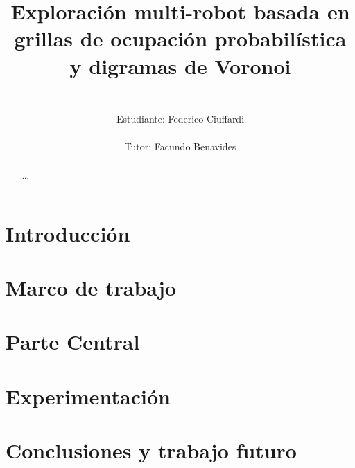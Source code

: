 \documentclass{report}
\title{%
\begin{figure}[H]
\vspace{-2.5cm}
  \subfloat{\hspace{0.075\textwidth}}
  \subfloat{\texttt{[image: logos/udelar.jpg]}}
  \subfloat{\hspace{0.2\textwidth}}
  \subfloat{\texttt{[image: logos/logo-fing.png]}}
  \subfloat{\hspace{0.2\textwidth}}
  \subfloat{\texttt{[image: logos/inco.png]}}
\end{figure}
\vspace{0.25cm}
\huge
Exploración multi-robot basada en grillas de ocupación probabilística y digramas de Voronoi\\
}
\author{%
\Large
\vspace{0.5cm}\\
Estudiante: Federico Ciuffardi\\
\vspace{0.5cm}\\
Tutor: Facundo Benavides%
}
\date{}
\renewcommand\_{\textunderscore\allowbreak}
\begin{document}

\maketitle

\thispagestyle{empty}
\setcounter{page}{1}

\begin{abstract}    %
    ...
\end{abstract}

\hfuzz=10pt 
\tableofcontents
\hfuzz=0pt 

\listoffigures  %
\listoftables   %
\listofalgorithms %

\chapter{Introducción}\label{cha:Intro}
\hfuzz=10pt 
\minitoc
\hfuzz=0pt 


\chapter{Marco de trabajo}\label{cha:marco}
\hfuzz=10pt 
\minitoc
\hfuzz=0pt 



\chapter{Parte Central}\label{cha:central}
\hfuzz=10pt 
\minitoc
\hfuzz=0pt 



\chapter{Experimentación}\label{cha:exp}
\hfuzz=10pt 
\minitoc
\hfuzz=0pt 



\chapter{Conclusiones y trabajo futuro}\label{cha:concl}
\hfuzz=10pt 
\minitoc
\hfuzz=0pt 



\begin{appendices}

\end{appendices}



\end{document}
